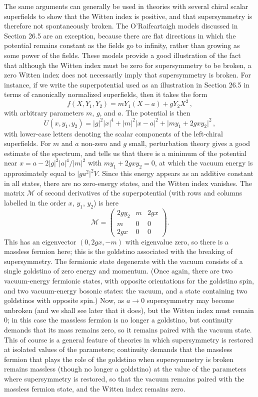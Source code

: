 The same arguments can generally be used in theories with several chiral
scalar superfields to show that the Witten index is positive, and that
supersymmetry is therefore not spontaneously broken. The O'Raifeartaigh
models discussed in Section 26.5 are an exception, because there are flat
directions in which the potential remains constant as the fields go to
infinity, rather than growing as some power of the fields. These models
provide a good illustration of the fact that although the Witten index
must be zero for supersymmetry to be broken, a zero Witten index does not
necessarily imply that supersymmetry is broken. For instance, if we write
the superpotential used as an illustration in Section 26.5 in terms of
canonically normalized superfields, then it takes the form
\[
  f(X,Y_1,Y_2)=mY_1(X-a)+gY_2X^2\,,
\]
with arbitrary parameters \(m\), \(g\), and \(a\). The potential is then
\[
  U(x,y_1,y_2)
  =
  \lvert g\rvert^2\lvert x\rvert^4
  +\lvert m\rvert^2\lvert x-a\rvert^2
  +\lvert my_1+2gxy_2\rvert^2\,,
\]
with lower-case letters denoting the scalar components of the left-chiral
superfields. For \(m\) and \(a\) non-zero and \(g\) small, perturbation
theory gives a good estimate of the spectrum, and tells us that there is a
minimum of the potential near
\(x=a-2\lvert g\rvert^2\lvert a\rvert^4/\lvert m\rvert^2\) with
\(my_1+2gxy_2=0\), at which the vacuum energy is approximately equal to
\(\lvert ga^2\rvert^2V\). Since this energy appears as an additive
constant in all states, there are no zero-energy states, and the Witten
index vanishes. The matrix \(\mathcal{M}\) of second derivatives of the
superpotential (with rows and columns labelled in the order \(x\),
\(y_1\), \(y_2\)) is here
\[
  \mathcal{M}
  =
  \begin{pmatrix}
    2gy_2&m&2gx\\
    m&0&0\\
    2gx&0&0
  \end{pmatrix}.
\]
This has an eigenvector \((0,2gx,-m)\) with eigenvalue zero, so there is a
massless fermion here; this is the goldstino associated with the breaking
of supersymmetry. The fermionic state degenerate with the vacuum consists
of a single goldstino of zero energy and momentum. (Once again, there are
two vacuum-energy fermionic states, with opposite orientations for the
goldstino spin, and two vacuum-energy bosonic states: the vacuum, and a
state containing two goldstinos with opposite spin.) Now, as \(a\to0\)
supersymmetry may become unbroken (and we shall see later that it does),
but the Witten index must remain 0; in this case the massless fermion is
no longer a goldstino, but continuity demands that its mass remains zero,
so it remains paired with the vacuum state. This of course is a general
feature of theories in which supersymmetry is restored at isolated values
of the parameters; continuity demands that the massless fermion that
plays the role of the goldstino when supersymmetry is broken remains
massless (though no longer a goldstino) at the value of the parameters
where supersymmetry is restored, so that the vacuum remains paired with
the massless fermion state, and the Witten index remains zero.


